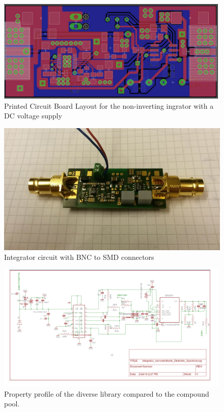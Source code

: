 \begin{figure}
\includegraphics[width=0.99\textwidth]{figures/Method/integrator/PCB_Integrator.png}
    \caption{Printed Circuit Board Layout for the non-inverting ingrator with a DC voltage supply} 
    \label{fig.solder}
\end{figure}
    
\begin{figure}[h!tb]
\includegraphics[width=\textwidth]{figures/Method/integrator/realintegrator.jpg}
\caption[Kurze Abbildungsbeschreibung]{Integrator circuit with BNC to SMD connectors}
\label{fig.realcircuit}
\end{figure}
    
    
    
\begin{figure}
\includegraphics[width=0.99\textwidth]{figures/Method/integrator/schematic.jpg}
 \caption{Property profile of the diverse library compared to the compound pool.}
 \end{figure}


